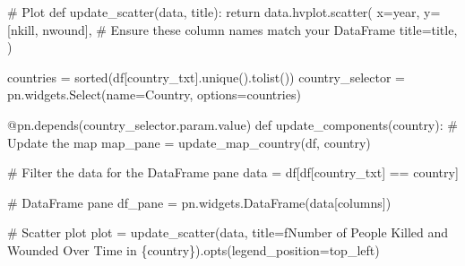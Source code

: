 \documentclass[
  letterpaper,
  DIV=11,
  numbers=noendperiod]{scrreprt}
\newenvironment{Shaded}{\begin{snugshade}}{\end{snugshade}}
\newcommand{\AttributeTok}[1]{\textcolor[rgb]{0.40,0.45,0.13}{#1}}
\newcommand{\BuiltInTok}[1]{\textcolor[rgb]{0.00,0.23,0.31}{#1}}
\newcommand{\CommentTok}[1]{\textcolor[rgb]{0.37,0.37,0.37}{#1}}
\newcommand{\ControlFlowTok}[1]{\textcolor[rgb]{0.00,0.23,0.31}{#1}}
\newcommand{\KeywordTok}[1]{\textcolor[rgb]{0.00,0.23,0.31}{#1}}
\newcommand{\NormalTok}[1]{\textcolor[rgb]{0.00,0.23,0.31}{#1}}
\newcommand{\OperatorTok}[1]{\textcolor[rgb]{0.37,0.37,0.37}{#1}}
\newcommand{\SpecialCharTok}[1]{\textcolor[rgb]{0.37,0.37,0.37}{#1}}
\newcommand{\SpecialStringTok}[1]{\textcolor[rgb]{0.13,0.47,0.30}{#1}}
\newcommand{\StringTok}[1]{\textcolor[rgb]{0.13,0.47,0.30}{#1}}
\begin{document}
\begin{Shaded}
\begin{Highlighting}[]
\CommentTok{\# Plot}
\KeywordTok{def}\NormalTok{ update\_scatter(data, title):}
        \ControlFlowTok{return}\NormalTok{ data.hvplot.scatter(}
\NormalTok{        x}\OperatorTok{=}\StringTok{\textquotesingle{}year\textquotesingle{}}\NormalTok{, }
\NormalTok{        y}\OperatorTok{=}\NormalTok{[}\StringTok{\textquotesingle{}nkill\textquotesingle{}}\NormalTok{, }\StringTok{\textquotesingle{}nwound\textquotesingle{}}\NormalTok{],  }\CommentTok{\# Ensure these column names match your DataFrame}
\NormalTok{        title}\OperatorTok{=}\NormalTok{title,}
\NormalTok{    )}
\end{Highlighting}
\end{Shaded}

\begin{Shaded}
\begin{Highlighting}[]
\NormalTok{countries }\OperatorTok{=} \BuiltInTok{sorted}\NormalTok{(df[}\StringTok{\textquotesingle{}country\_txt\textquotesingle{}}\NormalTok{].unique().tolist())}
\NormalTok{country\_selector }\OperatorTok{=}\NormalTok{ pn.widgets.Select(name}\OperatorTok{=}\StringTok{\textquotesingle{}Country\textquotesingle{}}\NormalTok{, options}\OperatorTok{=}\NormalTok{countries)}

\AttributeTok{@pn.depends}\NormalTok{(country\_selector.param.value)}
\KeywordTok{def}\NormalTok{ update\_components(country):}
    \CommentTok{\# Update the map}
\NormalTok{    map\_pane }\OperatorTok{=}\NormalTok{ update\_map\_country(df, country)}
    
    \CommentTok{\# Filter the data for the DataFrame pane}
\NormalTok{    data }\OperatorTok{=}\NormalTok{ df[df[}\StringTok{\textquotesingle{}country\_txt\textquotesingle{}}\NormalTok{] }\OperatorTok{==}\NormalTok{ country]}
    
    \CommentTok{\# DataFrame pane}
\NormalTok{    df\_pane }\OperatorTok{=}\NormalTok{ pn.widgets.DataFrame(data[columns])}
    
    \CommentTok{\# Scatter plot}
\NormalTok{    plot }\OperatorTok{=}\NormalTok{ update\_scatter(data, title}\OperatorTok{=}\SpecialStringTok{f\textquotesingle{}Number of People Killed and Wounded Over Time in }\SpecialCharTok{\{}\NormalTok{country}\SpecialCharTok{\}}\SpecialStringTok{\textquotesingle{}}\NormalTok{).opts(legend\_position}\OperatorTok{=}\StringTok{\textquotesingle{}top\_left\textquotesingle{}}\NormalTok{)}
    

\end{Highlighting}
\end{Shaded}
\end{document}
